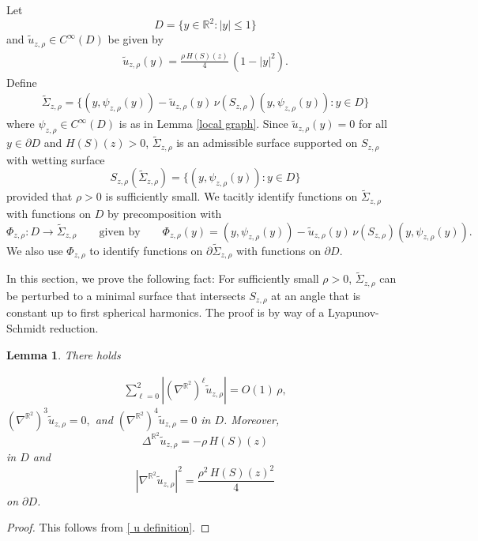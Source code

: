 \documentclass[11pt]{amsart}
\newtheorem{lem}[prop]{Lemma}
\begin{document}
Let $$D=\{y\in \mathbb{R}^2:|y|\leq 1\}$$ and  $\tilde u_{z,\rho}\in C^\infty(D)$ be given by
\begin{align} \label{ u definition} 
	\tilde 	u_{z,\rho}(y)=\frac{\rho\,H(S)(z)}{4}\,\left(1-|y|^2\right).
\end{align}
Define
\begin{align} \label{tilde sigma definition} 
\tilde \Sigma_{z,\rho}=\{(y,\psi_{z,\rho}(y))-\tilde u_{z,\rho}(y)\,\nu(S_{z,\rho})(y,\psi_{z,\rho}(y)):y\in D\}
\end{align} 
where $\psi_{z,\rho}\in C^\infty(D)$ is as in Lemma \ref{local graph}. Since $\tilde u_{z,\rho}(y)=0$ for all $y\in \partial D$ and $H(S)(z)>0$, $\tilde \Sigma_{z,\rho}$ is an admissible surface supported on $S_{z,\rho}$ with wetting surface $$S_{z,\rho}(\tilde \Sigma_{z,\rho})=\{(y,\psi_{z,\rho}(y)):y\in D\}$$ provided that $\rho>0$ is sufficiently small. We tacitly identify functions on $\tilde \Sigma_{z,\rho}$ with functions on $D$ by precomposition with 
$$
\Phi_{z,\rho}:D\to \tilde \Sigma_{z,\rho}\qquad\text{given by}\qquad  \Phi_{z,\rho}(y)= (y,\psi_{z,\rho}(y))-\tilde u_{z,\rho}(y)\,\nu(S_{z,\rho})(y,\psi_{z,\rho}(y)).
$$
We also use $\Phi_{z,\rho}$ to identify functions on $\partial \tilde \Sigma_{z,\rho}$ with functions on $\partial D$.

 
In this section, we prove the following fact: For sufficiently small $\rho>0$, $\tilde \Sigma_{z,\rho}$ can be perturbed to a minimal surface that intersects $S_{z,\rho}$ at an angle that is constant up to first spherical harmonics. The proof is by way of a Lyapunov-Schmidt reduction.


 





\begin{lem} \label{u estimates}
	There holds 

\begin{align*}
\sum_{\ell=0}^2|(\nabla^{\mathbb{R}^2})^\ell \tilde u_{z,\rho}|=O(1)\,\rho,
\end{align*}
$
(\nabla^{\mathbb{R}^2})^3 \tilde u_{z,\rho}=0,$ and $ (\nabla^{\mathbb{R}^2})^4 \tilde u_{z,\rho}=0$ in $D$. Moreover, 	$$
\Delta^{\mathbb{R}^2} \tilde u_{z,\rho}=-\rho\,H(S)(z)
$$
in $D$ and 
$$
|\nabla^{\mathbb{R}^2} \tilde u_{z,\rho}|^2=\frac{\rho^2\,H(S)(z)^2}4
$$
on $\partial D$.
	
\end{lem}
\begin{proof}
	This follows from \eqref{ u definition}.
\end{proof}
\end{document}
